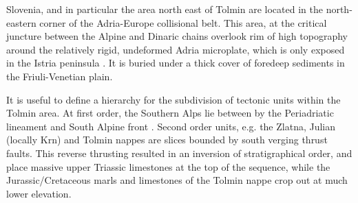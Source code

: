 Slovenia, and in particular the area north east of Tolmin are located in the north-eastern corner of the Adria-Europe collisional belt. 
This area, at the critical juncture between the Alpine and Dinaric chains overlook rim of high topography around the relatively rigid, undeformed Adria microplate, which is only exposed in the Istria peninsula \citep{vsmuc2009tectonic}. 
It is buried under a thick cover of foredeep sediments in the Friuli-Venetian plain. 

It is useful to define a hierarchy for the subdivision of tectonic units within the Tolmin area. 
At first order, the Southern Alps lie between by the Periadriatic lineament and South Alpine front \citep{placer1998contribution}. 
Second order units, e.g. the Zlatna, Julian (locally Krn) and Tolmin nappes are slices bounded by south verging thrust faults. 
This reverse thrusting resulted in an inversion of stratigraphical order, and place massive upper Triassic limestones at the top of the sequence, while the Jurassic/Cretaceous marls and limestones of the Tolmin nappe crop out at much lower elevation.

